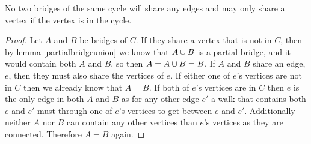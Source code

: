 \documentclass{article}
\begin{document}
\begin{corallary}
	No two bridges of the same cycle will share any edges and may only share a vertex if the vertex is in the cycle. 
\end{corallary}
\begin{proof}
	Let $A$ and $B$ be bridges of $C$. If they share a vertex that is not in $C$, then by lemma \ref{partialbridgeunion} we know that $A\cup B$ is a partial bridge, and it would contain both $A$ and $B$, so then $A = A\cup B = B$. If $A$ and $B$ share an edge, $e$, then they must also share the vertices of $e$. If either one of $e$'s vertices are not in $C$ then we already know that $A=B$. If both of $e$'s vertices are in $C$ then $e$ is the only edge in both $A$ and $B$ as for any other edge $e'$ a walk that contains both $e$ and $e'$ must through one of $e$'s vertices to get between $e$ and $e'$. Additionally neither $A$ nor $B$ can contain any other vertices than $e$'s vertices as they are connected. Therefore $A=B$ again.
\end{proof}
\end{document}
